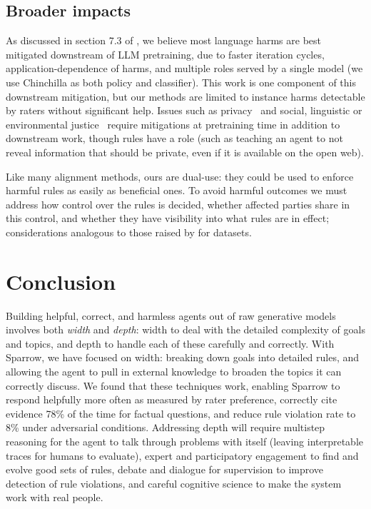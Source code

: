 \subsection{Broader impacts} \label{sec:impacts}

As discussed in section 7.3 of \citet{rae2021gopher}, we believe most language harms are best mitigated downstream of LLM pretraining, due to faster iteration cycles, application-dependence of harms, and multiple roles served by a single model (we use Chinchilla as both policy and classifier).  This work is one component of this downstream mitigation, but our methods are limited to instance harms detectable by raters without significant help.  Issues such as privacy~\citep{abadi2016privacy} and social, linguistic or environmental justice~\citep{bender2021dangers} require mitigations at pretraining time in addition to downstream work, though rules have a role (such as teaching an agent to not reveal information that should be private, even if it is available on the open web).

Like many alignment methods, ours are dual-use: they could be used to enforce harmful rules as easily as beneficial ones. To avoid harmful outcomes we must address how control over the rules is decided, whether affected parties share in this control, and whether they have visibility into what rules are in effect; considerations analogous to those raised by \citet{denton2020people} for datasets.

\section{Conclusion}

Building helpful, correct, and harmless agents out of raw generative models involves both \emph{width} and \emph{depth}: width to deal with the detailed complexity of goals and topics, and depth to handle each of these carefully and correctly.  With Sparrow, we have focused on width: breaking down goals into detailed rules, and allowing the agent to pull in external knowledge to broaden the topics it can correctly discuss. We found that these techniques work, enabling Sparrow to respond helpfully more often as measured by rater preference, correctly cite evidence 78\% of the time for factual questions, and reduce rule violation rate to 8\% under adversarial conditions. Addressing depth will require multistep reasoning for the agent to talk through problems with itself (leaving interpretable traces for humans to evaluate), expert and participatory engagement to find and evolve good sets of rules, debate and dialogue for supervision to improve detection of rule violations, and careful cognitive science to make the system work with real people.


